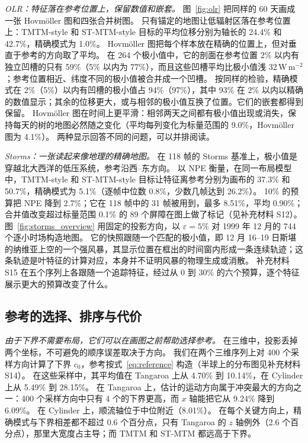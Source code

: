 \documentclass[fontset=none,zihao=5,a4paper]{ctexart}
\begin{document}
\emph{OLR：特征落在参考位置上，保留数值和嵌套。}
图~\ref{fig:olr} 把同样的 60 天画成一张 Hovm\"oller 图和四张合并树图。
只有锚定的地图让低辐射区落在参考位置上：TMTM-style 和 ST-MTM-style 目标的平均位移分别为轴长的 24.4\% 和 42.7\%，精确模式为 1.0\%。
Hovm\"oller 图把每个样本放在精确的位置上，但对垂直于参考的方向取了平均。
在 264 个极小值中，它的剖面在参考位置 2\% 以内有独立凹槽的只有 59\%（5\% 以内为 77\%），而且这些凹槽平均比极小值浅 32\,W\,m$^{-2}$；参考位置相近、纬度不同的极小值被合并成一个凹槽。
按同样的检验，精确模式在 2\%（5\%）以内有凹槽的极小值占 94\%（97\%），其中 93\% 在 2\% 以内以精确的数值显示；其余的位移更大，或与相邻的极小值互换了位置。它们的嵌套都得到保留。
Hovm\"oller 图在时间上更平滑：相邻两天之间都有极小值出现或消失，保持每天的树的地图必然随之变化（平均每列变化为标量范围的 9.0\%，Hovm\"oller 图为 4.1\%）。
两种显示回答不同的问题，可以并排阅读。

\emph{Storms：一张读起来像地理的精确地图。}
在 118 帧的 Storms 基准上，极小值是穿越北大西洋的低压系统，参考沿西–东方向。
以 NPE 衡量，在同一布局模型中，TMTM-style 和 ST-MTM-style 目标让特征离参考分别为画布的 37.3\% 和 50.7\%，精确模式为 5.1\%（逐帧中位数 0.8\%，少数几帧达到 26.2\%）。
10\% 的预算把 NPE 降到 2.7\%；它在 118 帧中的 31 帧被用到，最多 8.51\%，平均 0.90\%；合并值改变超过标量范围 0.1\% 的 89 个屏障在图上做了标记（见补充材料 S12）。
图~\ref{fig:storms_overview} 用固定的投影方向，以 $\varepsilon=5\%$ 对 1999 年 12 月的 744 个逐小时场构造地图。
它的快照跟随一个匹配的极小值，即 12 月 16–19 日斯堪的纳维亚上空的一个强风暴，其显示位置在框出的时间窗内形成一条连续轨迹；这条轨迹是叶特征的计算对应，本身并不证明风暴的物理生成或消散。
补充材料 S15 在五个序列上各跟随一个追踪特征，经过从 0 到 30\% 的六个预算，逐个特征展示更大的预算改变了什么。

\subsection{参考的选择、排序与代价}\label{sec:ablation}
\emph{由于下界不需要布局，它们可以在画图之前帮助选择参考。}
在三维中，投影丢掉两个坐标，不可避免的顺序误差取决于方向。
我们在两个三维序列上对 400 个采样方向计算了下界 $c_0$，参考按式~\ref{eq:reference} 构造（半球上的分布图见补充材料 S14）。
在这些采样中，其平均值在 Tangaroa 上从 4.70\% 到 10.14\%，在 Cylinder 上从 5.49\% 到 28.15\%。
在 Tangaroa 上，估计的运动方向属于冲突最大的方向之一：400 个采样方向中只有 4 个的下界更高，而 $x$ 轴能把它从 9.24\% 降到 6.09\%。
在 Cylinder 上，顺流轴位于中位附近（8.01\%）。
在每个关键方向上，精确模式与下界相差都不超过 0.6 个百分点，只有 Tangaroa 的 $z$ 轴例外（2.6 个百分点），那里大宽度占主导；而 TMTM 和 ST-MTM 都远高于下界。
\end{document}
